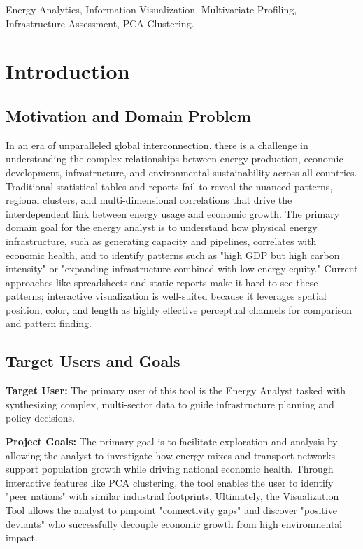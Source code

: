\documentclass[conference]{IEEEtran}
\begin{document}
\begin{IEEEkeywords}
Energy Analytics, Information Visualization, Multivariate Profiling, Infrastructure Assessment, PCA Clustering.
\end{IEEEkeywords}

\section{Introduction}
\subsection{Motivation and Domain Problem}
In an era of unparalleled global interconnection, there is a challenge in understanding the complex relationships between energy production, economic development, infrastructure, and environmental sustainability across all countries. Traditional statistical tables and reports fail to reveal the nuanced patterns, regional clusters, and multi-dimensional correlations that drive the interdependent link between energy usage and economic growth. The primary domain goal for the energy analyst is to understand how physical energy infrastructure, such as generating capacity and pipelines, correlates with economic health, and to identify patterns such as "high GDP but high carbon intensity" or "expanding infrastructure combined with low energy equity." Current approaches like spreadsheets and static reports make it hard to see these patterns; interactive visualization is well-suited because it leverages spatial position, color, and length as highly effective perceptual channels for comparison and pattern finding.

\subsection{Target Users and Goals}
\textbf{Target User:} The primary user of this tool is the Energy Analyst tasked with synthesizing complex, multi-sector data to guide infrastructure planning and policy decisions.

\textbf{Project Goals:} The primary goal is to facilitate exploration and analysis by allowing the analyst to investigate how energy mixes and transport networks support population growth while driving national economic health. Through interactive features like PCA clustering, the tool enables the user to identify "peer nations" with similar industrial footprints. Ultimately, the Visualization Tool allows the analyst to pinpoint "connectivity gaps" and discover "positive deviants" who successfully decouple economic growth from high environmental impact.
\end{document}

